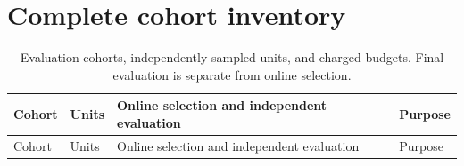 \documentclass[preprint,11pt,sort&compress]{elsarticle}
\begin{document}
\FloatBarrier\section{Complete cohort inventory}
\begingroup\small
\begin{longtable}{>{\raggedright\arraybackslash}p{}>{\raggedright\arraybackslash}p{}>{\raggedright\arraybackslash}p{}>{\raggedright\arraybackslash}p{}}
\caption{Evaluation cohorts, independently sampled units, and charged budgets. Final evaluation is separate from online selection.}\label{tab:cohorts}\\
\toprule
Cohort & Units & Online selection and independent evaluation & Purpose\\
\midrule\endfirsthead
\toprule
Cohort & Units & Online selection and independent evaluation & Purpose\\
\midrule\endhead


\end{longtable}
\end{document}
